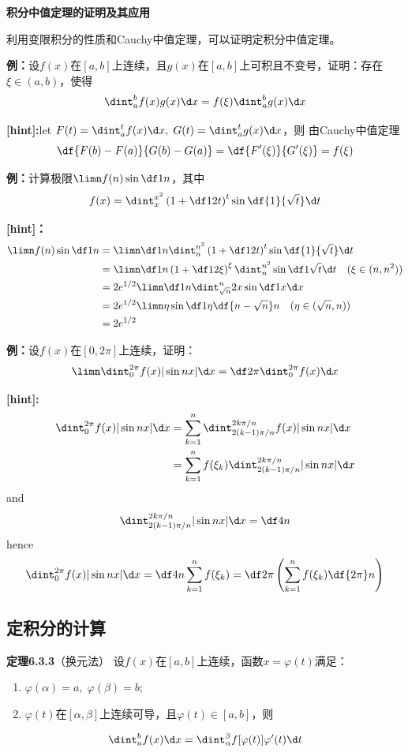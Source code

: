 \begin{shaded}
	{\bf 积分中值定理的证明及其应用}
	
	利用变限积分的性质和Cauchy中值定理，可以证明定积分中值定理。

	{\bf 例：}设$f(x)$在$[a,b]$上连续，且$g(x)$在$[a,b]$上可积且不变号，证明：存在
	$\xi\in(a,b)$，使得
	$$\dint_a^bf(x)g(x)\d x=f(\xi)\dint_a^bg(x)\d x$$
	
	{\bf [hint]:}let $F(t)=\dint_a^tf(x)\d x,\;G(t)=\dint_a^tg(x)\d x$，则
	由Cauchy中值定理
	$$\df{F(b)-F(a)}{G(b)-G(a)}=\df{F'(\xi)}{G'(\xi)}=f(\xi)$$
	
	{\bf 例：}计算极限$\limn f(n)\sin\df 1n$，其中
	  $$f(x)=\dint_x^{x^2}\left(1+\df 1{2t}\right)^t\sin\df{1}{\sqrt t}\d t$$
	
	{\bf [hint]：}
	\begin{align}
		\limn f(n)\sin\df 1n&=\limn\df1n\dint_n^{n^2}\left(1+\df
		1{2t}\right)^t\sin\df{1}{\sqrt t}\d t\notag\\
		&=\limn\df1n\left(1+\df1{2\xi}\right)^{\xi}\dint_n^{n^2}
		\sin\df1{\sqrt t}\d t\quad(\xi\in(n,n^2))\notag\\
		&=2e^{1/2}\limn\df1n\dint_{\sqrt n}^n2x\sin\df1x\d x\notag\\
		&=2e^{1/2}\limn\eta\sin\df1{\eta}\df{n-\sqrt n}n\quad(\eta\in(\sqrt
		n,n))\notag\\
		&=2e^{1/2}\notag
	\end{align}
	
	{\bf 例：}设$f(x)$在$[0,2\pi]$上连续，证明：
	$$\limn\dint_0^{2\pi}f(x)|\sin nx|\d x=\df 2{\pi}\dint_0^{2\pi}f(x)\d x$$
	
	{\bf [hint]:}
	\begin{align}
	\dint_0^{2\pi}f(x)|\sin nx|\d x
	&=\sum\limits_{k=1}^n\dint_{2(k-1)\pi/n}^{2k\pi/n}f(x)|\sin nx|\d x\notag\\
	&=\sum\limits_{k=1}^nf(\xi_k)\dint_{2(k-1)\pi/n}^{2k\pi/n}|\sin nx|\d x\notag
	\end{align}
	and
	$$\dint_{2(k-1)\pi/n}^{2k\pi/n}|\sin nx|\d x=\df4n$$
	hence
	$$\dint_0^{2\pi}f(x)|\sin nx|\d x=\df4n\sum\limits_{k=1}^nf(\xi_k)
	=\df2{\pi}\left(\sum\limits_{k=1}^nf(\xi_k)\df{2\pi}n\right)$$
\end{shaded}

\subsection{定积分的计算}

{\bf 定理6.3.3}（换元法）
设$f(x)$在$[a,b]$上连续，函数$x=\varphi(t)$满足：
\begin{enumerate}[(1)]
  \setlength{\itemindent}{1cm}
  \item $\varphi(\alpha)=a,\;\varphi(\beta)=b$;
  \item $\varphi(t)$在$[\alpha,\beta]$上连续可导，且$\varphi(t)\in[a,b]$，则
\end{enumerate}
$${\dint_a^bf(x)\d
x=\dint_{\alpha}^{\beta}f[\varphi(t)]\varphi'(t)\d t}$$

